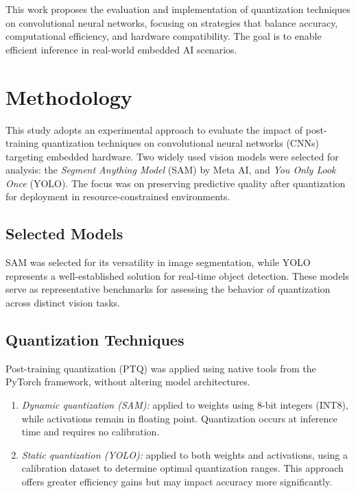 \documentclass[12pt]{article}
\begin{document}
This work proposes the evaluation and implementation of quantization techniques on convolutional neural networks, focusing on strategies that balance accuracy, computational efficiency, and hardware compatibility. The goal is to enable efficient inference in real-world embedded AI scenarios.

\section{Methodology}

This study adopts an experimental approach to evaluate the impact of post-training quantization techniques on convolutional neural networks (CNNs) targeting embedded hardware. Two widely used vision models were selected for analysis: the \textit{Segment Anything Model} (SAM) by Meta AI, and \textit{You Only Look Once} (YOLO). The focus was on preserving predictive quality after quantization for deployment in resource-constrained environments.

\subsection{Selected Models}

SAM was selected for its versatility in image segmentation, while YOLO represents a well-established solution for real-time object detection. These models serve as representative benchmarks for assessing the behavior of quantization across distinct vision tasks.

\subsection{Quantization Techniques}

Post-training quantization (PTQ) was applied using native tools from the PyTorch framework, without altering model architectures.

\begin{enumerate}
    \item \textit{Dynamic quantization (SAM):} applied to weights using 8-bit integers (INT8), while activations remain in floating point. Quantization occurs at inference time and requires no calibration.
    
    \item \textit{Static quantization (YOLO):} applied to both weights and activations, using a calibration dataset to determine optimal quantization ranges. This approach offers greater efficiency gains but may impact accuracy more significantly.
\end{enumerate}
\end{document}

